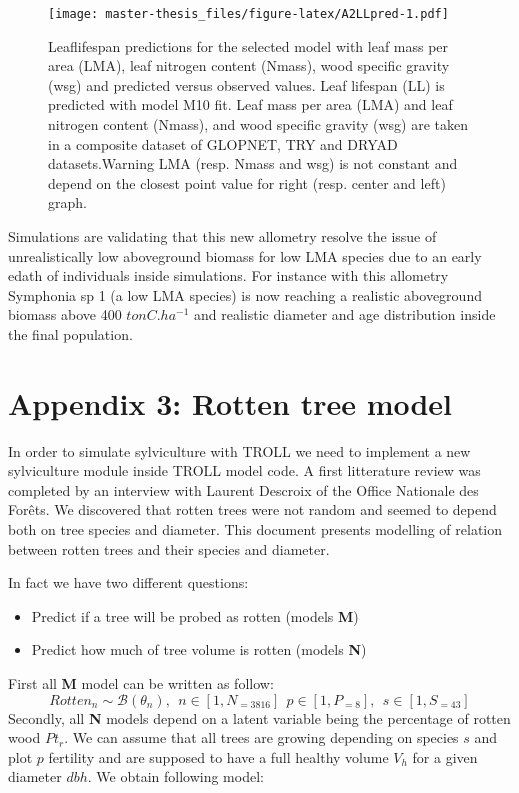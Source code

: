 \documentclass[12pt,]{article}
\providecommand{\tightlist}{%
\setlength{\itemsep}{0pt}\setlength{\parskip}{0pt}}
\let\oldsection\section
\renewcommand\section{\newpage\oldsection}
\theoremstyle{definition}
\theoremstyle{definition}
\theoremstyle{remark}
\begin{document}
\begin{figure}[htbp]
\centering
\texttt{[image: master-thesis\_files/figure-latex/A2LLpred-1.pdf]}
\caption{\label{fig:A2LLpred}Leaflifespan predictions for the selected model
with leaf mass per area (LMA), leaf nitrogen content (Nmass), wood
specific gravity (wsg) and predicted versus observed values. Leaf
lifespan (LL) is predicted with model M10 fit. Leaf mass per area (LMA)
and leaf nitrogen content (Nmass), and wood specific gravity (wsg) are
taken in a composite dataset of GLOPNET, TRY and DRYAD datasets.Warning
LMA (resp. Nmass and wsg) is not constant and depend on the closest
point value for right (resp. center and left) graph.}
\end{figure}

Simulations are validating that this new allometry resolve the issue of
unrealistically low aboveground biomass for low LMA species due to an
early edath of individuals inside simulations. For instance with this
allometry Symphonia sp 1 (a low LMA species) is now reaching a realistic
aboveground biomass above 400 \(tonC.ha^{-1}\) and realistic diameter
and age distribution inside the final population.

\hypertarget{appendix-3-rotten-tree-model}{\section{Appendix 3: Rotten
tree model}\label{appendix-3-rotten-tree-model}}

In order to simulate sylviculture with TROLL we need to implement a new
sylviculture module inside TROLL model code. A first litterature review
was completed by an interview with Laurent Descroix of the Office
Nationale des Forêts. We discovered that rotten trees were not random
and seemed to depend both on tree species and diameter. This document
presents modelling of relation between rotten trees and their species
and diameter.

In fact we have two different questions:

\begin{itemize}
\tightlist
\item
  Predict if a tree will be probed as rotten (models \textbf{M})
\item
  Predict how much of tree volume is rotten (models \textbf{N})
\end{itemize}

First all \textbf{M} model can be written as follow:
\[Rotten_n \sim \mathcal{B}(\theta_n), ~~n \in [1,N_{=3816}] ~~ p \in [1, P_{=8}], ~~ s \in [1, S_{=43}]\]
Secondly, all \textbf{N} models depend on a latent variable being the
percentage of rotten wood \(Pt_r\). We can assume that all trees are
growing depending on species \(s\) and plot \(p\) fertility and are
supposed to have a full healthy volume \(V_h\) for a given diameter
\(dbh\). We obtain following model:
\end{document}
